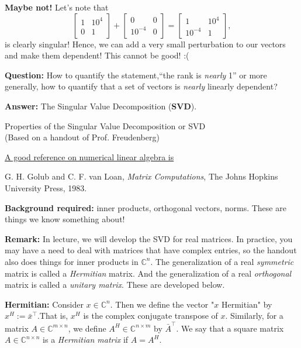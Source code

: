 \documentclass[letterpaper]{article}
\newcommand{\cp}{\mathbb C}    %
\begin{document}
\textbf{Maybe not!} Let's note that
 $$\left[ \begin{array}{ll} 1 & 10^4 \\0& 1\end{array} \right] +  \left[ \begin{array}{ll} 0 & 0 \\10^{-4}& 0\end{array} \right]  =  \left[ \begin{array}{ll} 1 & 10^4 \\10^{-4}& 1\end{array} \right],$$
 is clearly singular! Hence, we can add a very small perturbation to our vectors and make them dependent! This cannot be good! :(

\noindent \textbf{Question:} How to quantify the statement,``the rank is \textit{nearly} 1'' or more generally, how to quantify that a set of vectors is \textit{nearly} linearly dependent?

\noindent \textbf{Answer:} The Singular Value Decomposition (\textbf{SVD}).

\newpage

{\Large \bf
\begin{center}
Properties of the Singular Value Decomposition or SVD\\
(Based on a handout of Prof. Freudenberg)
\end{center}
}
\noindent \underline{A good reference on numerical linear algebra is}

G. H. Golub and C. F. van Loan, \textit{Matrix Computations}, The Johns Hopkins University Press, 1983.

\noindent \textbf{Background required:} inner products, orthogonal vectors, norms. These are things we know something about!

\noindent \textbf{Remark:} In lecture, we will develop the SVD for real matrices. In practice, you may have a need to deal with matrices that have complex entries, so the handout also does things for inner products in $\cp^n$. The generalization of a real \textit{symmetric} matrix is called a \textit{Hermitian} matrix. And the generalization of a real \textit{orthogonal} matrix is called a \textit{unitary matrix}. These are developed below.

\noindent \textbf{Hermitian:}
 Consider $x\in \cp^n$. Then we define the vector "$x$ Hermitian" by $x^H:=\bar{x}^\top$.That is, $x^H$ is the complex conjugate transpose of $x$. Similarly, for a matrix $A\in \cp^{m\times n}$, we define $A^H \in \cp^{n\times m}$ by $\bar{A}^\top$. We say that a square matrix  $A\in \cp^{n\times n}$ is a \textit{Hermitian matrix} if $A=A^H$.
\end{document}
